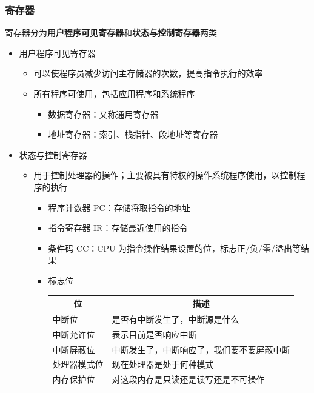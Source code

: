 \documentclass[cs4size,a4paper,10pt]{ctexart}
\begin{document}
	\subsubsection{寄存器}
	寄存器分为\textbf{用户程序可见寄存器}和\textbf{状态与控制寄存器}两类
	\begin{itemize}
		\item 用户程序可见寄存器
		\begin{itemize}
			\item 可以使程序员减少访问主存储器的次数，提高指令执行的效率
			\item 所有程序可使用，包括应用程序和系统程序
			\begin{itemize}
				\item 数据寄存器：又称通用寄存器
				\item 地址寄存器：索引、栈指针、段地址等寄存器
			\end{itemize}
		\end{itemize}
		\item 状态与控制寄存器
		\begin{itemize}
			\item 用于控制处理器的操作；主要被具有特权的操作系统程序使用，以控制程序的执行
			\begin{itemize}
				\item 程序计数器 PC：存储将取指令的地址
				\item 指令寄存器 IR：存储最近使用的指令
				\item 条件码 CC：CPU 为指令操作结果设置的位，标志正/负/零/溢出等结果
				\item 标志位
				\begin{table}[H]
					\centering
					\begin{tabular}{|l|l|}
					\hline
					\multicolumn{1}{|c|}{位} & \multicolumn{1}{c|}{描述} \\ \hline
					中断位                     & 是否有中断发生了，中断源是什么         \\ \hline
					中断允许位                   & 表示目前是否响应中断              \\ \hline
					中断屏蔽位                   & 中断发生了，中断响应了，我们要不要屏蔽中断   \\ \hline
					处理器模式位                  & 现在处理器是处于何种模式            \\ \hline
					内存保护位                   & 对这段内存是只读还是读写还是不可操作      \\ \hline
					\end{tabular}
					\end{table}
			\end{itemize}
		\end{itemize}
	\end{itemize}
\end{document}
